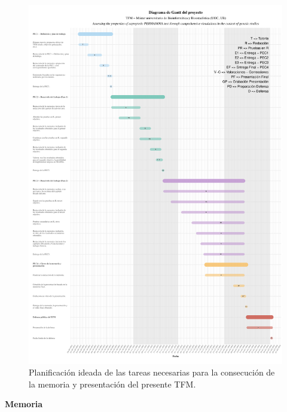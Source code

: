 \documentclass[IB,BIB]{TFUOC}%
\begin{document}
\newpage

\begin{figure}[!htbp]
    \centering
    \includegraphics[scale=.5]{TFMGantt.pdf}
    \caption{\scriptsize{Planificación ideada de las tareas necesarias para la consecución de la memoria y presentación del presente TFM.}}
    \label{fig:PEC3 - GANTT_TFM}
\end{figure}


\newpage\null\thispagestyle{empty} %

\Huge
\vfill

\textbf{Memoria}
\normalsize

\newpage



\end{document}
